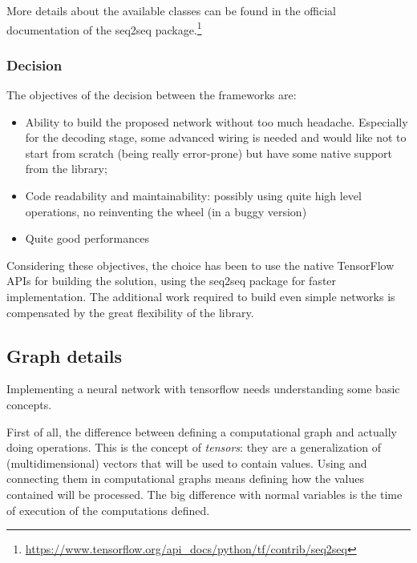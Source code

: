 More details about the available classes can be found in the official documentation of the seq2seq package.\footnote{\url{https://www.tensorflow.org/api\_docs/python/tf/contrib/seq2seq}}

\subsubsection{Decision}
The objectives of the decision between the frameworks are:

\begin{itemize}
	\item Ability to build the proposed network without too much headache. Especially for the decoding stage, some advanced wiring is needed and would like not to start from scratch (being really error-prone) but have some native support from the library;

	\item Code readability and maintainability: possibly using quite high level operations, no reinventing the wheel (in a buggy version)

	\item Quite good performances
\end{itemize}

Considering these objectives, the choice has been to use the native TensorFlow APIs for building the solution, using the seq2seq package for faster implementation. The additional work required to build even simple networks is compensated by the great flexibility of the library.

\subsection{Graph details}
\label{implementationNNDetails}

Implementing a neural network with tensorflow needs understanding some basic concepts.

First of all, the difference between defining a computational graph and actually doing operations. This is the concept of \textit{tensors}: they are a generalization of (multidimensional) vectors that will be used to contain values. Using and connecting them in computational graphs means defining how the values contained will be processed. The big difference with normal variables is the time of execution of the computations defined.

